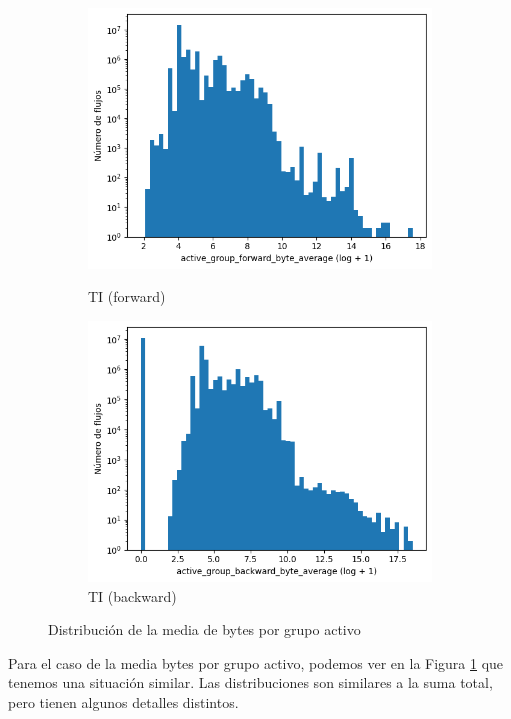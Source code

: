 \begin{figure}[H]
\begin{subfigure}[b]{0.26\textwidth}
        \includegraphics[width=\linewidth]{media/packet_pincer_toniot/active_group_forward_byte_average_log_x_log_y.png}
        \caption{TI (forward)}
        \includegraphics[width=\linewidth]{media/packet_pincer_toniot/active_group_backward_byte_average_log_x_log_y.png}
        \caption{TI (backward)}
    \end{subfigure}
       \caption{Distribución de la media de bytes por grupo activo}
       \label{fig:packet_pincer_active_group_byte_average}
\end{figure}

Para el caso de la media bytes por grupo activo, podemos ver en la Figura \ref{fig:packet_pincer_active_group_byte_average} que tenemos una situación similar. Las distribuciones son similares a la suma total, pero tienen algunos detalles distintos.

